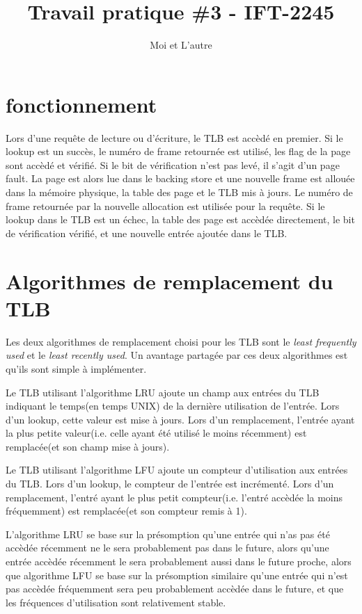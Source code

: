 \documentclass{article}
\title{Travail pratique \#3 - IFT-2245}
\author{Moi et L'autre}
\begin{document}
\maketitle

\section{fonctionnement}
Lors d'une requête de lecture ou d'écriture, le TLB est accèdé en premier. Si le lookup est un succès, le numéro de frame retournée est utilisé, les flag de la page sont accèdé et vérifié. Si le bit de vérification n'est pas levé, il s'agit d'un page fault. La page est alors lue dans le backing store et une nouvelle frame est allouée dans la mémoire physique, la table des page et le TLB mis à jours. Le numéro de frame retournée par la nouvelle allocation est utilisée pour la requête. Si le lookup dans le TLB est un échec, la table des page est accèdée directement, le bit de vérification vérifié, et une nouvelle entrée ajoutée dans le TLB.


\section{Algorithmes de remplacement du TLB}
Les deux algorithmes de remplacement choisi pour les TLB sont le \emph{least frequently used} et le \emph{least recently used}.
Un avantage partagée par ces deux algorithmes est qu'ils sont simple à implémenter.

Le TLB utilisant l'algorithme LRU ajoute un champ  aux entrées du TLB indiquant le temps(en temps UNIX) de la dernière utilisation de l'entrée. Lors d'un lookup, cette valeur est mise à jours. Lors d'un remplacement, l'entrée ayant la plus petite valeur(i.e. celle ayant été utilisé le moins récemment) est remplacée(et son champ  mise à jours).

Le TLB utilisant l'algorithme LFU ajoute un compteur d'utilisation aux entrées du TLB. Lors d'un lookup, le compteur de l'entrée est incrémenté. Lors d'un remplacement, l'entré ayant le plus petit compteur(i.e. l'entré accèdée la moins fréquemment) est remplacée(et son compteur remis à 1).

L'algorithme LRU se base sur la présomption qu'une entrée qui n'as pas été accèdée récemment ne le sera probablement pas dans le future, alors qu'une entrée accèdée récemment le sera probablement aussi dans le future proche, alors que algorithme LFU se base sur la présomption similaire qu'une entrée qui n'est pas accèdée fréquemment sera peu probablement accèdée dans le future, et que les fréquences d'utilisation sont relativement stable.
\end{document}
